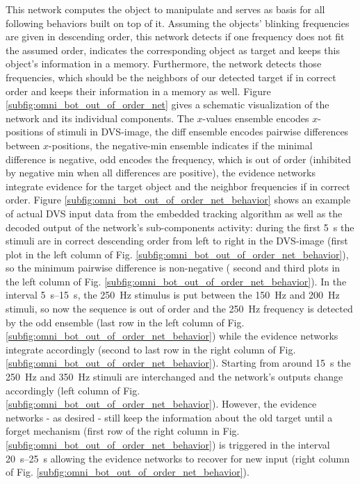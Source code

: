 This network computes the object to manipulate and serves as basis for all following behaviors built on top of it. 
Assuming the objects' blinking frequencies are given in descending order, this network detects if one frequency does not fit the assumed order, indicates the corresponding object as target and keeps this object's information in a memory. 
Furthermore, the network detects those frequencies, which should be the neighbors of our detected target if in correct order and keeps their information in a memory as well.
Figure \ref{subfig:omni_bot_out_of_order_net} gives a schematic visualization of the network and its individual components.
The $x$-values ensemble encodes $x$-positions of stimuli in \ac{DVS}-image, the diff ensemble encodes pairwise differences between $x$-positions, the negative-min ensemble indicates if the minimal difference is negative, odd encodes the frequency, which is out of order (inhibited by negative min when all differences are positive), the evidence networks integrate evidence for the target object and the neighbor frequencies if in correct order.
Figure \ref{subfig:omni_bot_out_of_order_net_behavior} shows an example of actual \ac{DVS} input data from the embedded tracking algorithm as well as the decoded output of the network’s sub-components activity: during the first \SI{5}{\second} the stimuli are in correct descending order from left to right in the \ac{DVS}-image (first plot in the left column of Fig. \ref{subfig:omni_bot_out_of_order_net_behavior}), so the minimum pairwise difference is non-negative ( second and third
plots in the left column of Fig. \ref{subfig:omni_bot_out_of_order_net_behavior}). 
In the interval \SIrange{5}{15}{\second}, the \SI{250}{\hertz} stimulus is put between the \SI{150}{\hertz} and \SI{200}{\hertz} stimuli, so now the sequence is out of order and the \SI{250}{\hertz} frequency is detected by the odd ensemble (last row in the left column of Fig. \ref{subfig:omni_bot_out_of_order_net_behavior}) while the evidence networks integrate accordingly (second to last row in the right column of Fig. \ref{subfig:omni_bot_out_of_order_net_behavior}). 
Starting from around \SI{15}{\second} the \SI{250}{\hertz} and \SI{350}{\hertz} stimuli are interchanged and the network's outputs change accordingly (left column of Fig. \ref{subfig:omni_bot_out_of_order_net_behavior}).
However, the evidence networks - as desired - still keep the information about the old target until a forget mechanism (first row of the right column in Fig. \ref{subfig:omni_bot_out_of_order_net_behavior}) is triggered in the interval \SIrange{20}{25}{\second} allowing the evidence networks to recover for new input (right column of Fig. \ref{subfig:omni_bot_out_of_order_net_behavior}).

